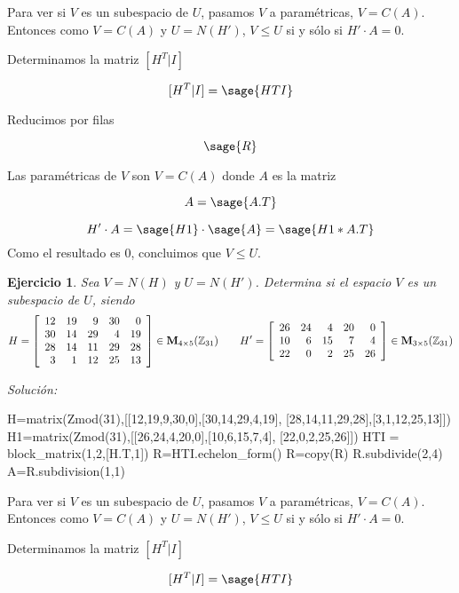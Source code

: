 \documentclass{amsart}
\newtheorem{ejer}{Ejercicio}
\begin{document}
Para ver si $V$ es un subespacio de $U$, pasamos $V$ a paramétricas, $V=C(A)$. 
Entonces como $V=C(A)$ y $U=N(H')$, $V\leq U$ si y sólo si $H'\cdot A = 0$.

Determinamos la matriz $[H^T|I]$

$$ [H^T|I] =  \sage{HTI} $$

Reducimos por filas

$$ \sage{R} $$

Las paramétricas de $V$ son $V = C(A)$ donde $A$ es la matriz

$$ A = \sage{A.T} $$


$$ H'\cdot A = \sage{H1}\cdot \sage{A} = \sage{H1*A.T} $$ Como el resultado es $0$, concluimos que $V\leq U$.



\begin{ejer} Sea $V = N(H)$ y $U = N(H')$. Determina si el espacio $V$ es un subespacio de $U$, siendo 
\[H = \left[\begin{array}{rrrrr}
12 & 19 & 9 & 30 & 0 \\
30 & 14 & 29 & 4 & 19 \\
28 & 14 & 11 & 29 & 28 \\
3 & 1 & 12 & 25 & 13
\end{array}\right] \in {\bf M}_{4 \times 5}({\mathbb Z}_{31}) \qquad
H' = \left[\begin{array}{rrrrr}
26 & 24 & 4 & 20 & 0 \\
10 & 6 & 15 & 7 & 4 \\
22 & 0 & 2 & 25 & 26
\end{array}\right] \in {\bf M}_{3 \times 5}({\mathbb Z}_{31}) \]
\end{ejer}

{\it Soluci\'on:}

\begin{sageblock}
H=matrix(Zmod(31),[[12,19,9,30,0],[30,14,29,4,19],
[28,14,11,29,28],[3,1,12,25,13]])
H1=matrix(Zmod(31),[[26,24,4,20,0],[10,6,15,7,4],
[22,0,2,25,26]])
HTI = block_matrix(1,2,[H.T,1])
R=HTI.echelon_form()
R=copy(R)
R.subdivide(2,4)
A=R.subdivision(1,1)
\end{sageblock}

Para ver si $V$ es un subespacio de $U$, pasamos $V$ a paramétricas, $V=C(A)$. 
Entonces como $V=C(A)$ y $U=N(H')$, $V\leq U$ si y sólo si $H'\cdot A = 0$.

Determinamos la matriz $[H^T|I]$

$$ [H^T|I] =  \sage{HTI} $$
\end{document}
